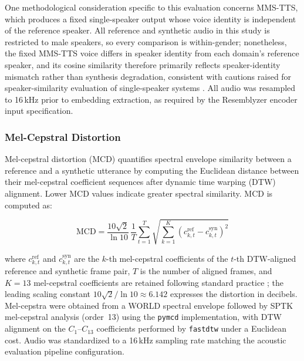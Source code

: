 \documentclass[a4paper,fleqn]{cas-dc}
\begin{document}
    One methodological consideration specific to this evaluation concerns
    MMS-TTS, which produces a fixed single-speaker output whose voice
    identity is independent of the reference speaker. All reference and
    synthetic audio in this study is restricted to male speakers, so every
    comparison is within-gender; nonetheless, the fixed MMS-TTS voice
    differs in speaker identity from each domain's reference speaker, and
    its cosine similarity therefore primarily reflects speaker-identity
    mismatch rather than synthesis degradation, consistent with cautions
    raised for speaker-similarity evaluation of single-speaker systems
    \citep{wang2023gzstv}. All audio was resampled to 16\,kHz prior to embedding extraction, as required by the Resemblyzer encoder input specification.
    
    \subsubsection{Mel-Cepstral Distortion}\label{sec:methodology-mcd}
    
    Mel-cepstral distortion (MCD) \citep{kubichek1993mcd} quantifies
    spectral envelope similarity between a reference and a synthetic
    utterance by computing the Euclidean distance between their
    mel-cepstral coefficient sequences after dynamic time warping (DTW)
    alignment. Lower MCD values indicate greater spectral similarity.
    MCD is computed as:
    
    \begin{equation}
      \text{MCD} = \frac{10\sqrt{2}}{\ln 10}\,\frac{1}{T}
      \sum_{t=1}^{T} \sqrt{\sum_{k=1}^{K}
      \left( c_{k,t}^{\text{ref}} - c_{k,t}^{\text{syn}} \right)^2}
      \label{eq:mcd}
    \end{equation}
    
    \noindent where $c_{k,t}^{\text{ref}}$ and $c_{k,t}^{\text{syn}}$ are
    the $k$-th mel-cepstral coefficients of the $t$-th DTW-aligned
    reference and synthetic frame pair, $T$ is the number of aligned
    frames, and $K = 13$ mel-cepstral coefficients are retained following
    standard practice \citep{kominek2008mcd}; the leading scaling constant
    $10\sqrt{2}/\ln 10 \approx 6.142$ expresses the distortion in decibels.
    Mel-cepstra were obtained from a WORLD spectral envelope followed by
    SPTK mel-cepstral analysis (order~13) using the \texttt{pymcd} implementation, with DTW
    alignment on the $C_1$--$C_{13}$ coefficients performed by
    \texttt{fastdtw} under a Euclidean cost. Audio was standardized to a
    16\,kHz sampling rate matching the acoustic evaluation pipeline configuration.
    
\end{document}
